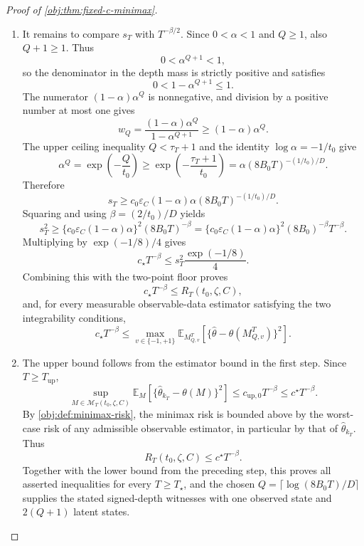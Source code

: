 \documentclass[11pt]{article}
\begin{document}
\begin{proof}[Proof of \cref{obj:thm:fixed-c-minimax}]
\begin{enumerate}
\item It remains to compare \(s_T\) with \(T^{-\beta/2}\). Since \(0<\alpha<1\) and \(Q\ge1\), also \(Q+1\ge1\). Thus
\[
0<\alpha^{Q+1}<1,
\]
so the denominator in the depth mass is strictly positive and satisfies
\[
0<1-\alpha^{Q+1}\le1.
\]
The numerator \((1-\alpha)\alpha^Q\) is nonnegative, and division by a positive number at most one gives
\[
w_Q
=
\frac{(1-\alpha)\alpha^Q}{1-\alpha^{Q+1}}
\ge
(1-\alpha)\alpha^Q .
\]
The upper ceiling inequality \(Q<\tau_T+1\) and the identity \(\log\alpha=-1/t_0\) give
\[
\alpha^Q
=
\exp\!\left(-\frac{Q}{t_0}\right)
\ge
\exp\!\left(-\frac{\tau_T+1}{t_0}\right)
=
\alpha(8B_0T)^{-(1/t_0)/D}.
\]
Therefore
\[
s_T
\ge
c_0\varepsilon_C(1-\alpha)\alpha
(8B_0T)^{-(1/t_0)/D}.
\]
Squaring and using \(\beta=(2/t_0)/D\) yields
\[
s_T^2
\ge
\{c_0\varepsilon_C(1-\alpha)\alpha\}^2
(8B_0T)^{-\beta}
=
\{c_0\varepsilon_C(1-\alpha)\alpha\}^2
(8B_0)^{-\beta}T^{-\beta}.
\]
Multiplying by \(\exp(-1/8)/4\) gives
\[
c_\star T^{-\beta}
\le
s_T^2\frac{\exp(-1/8)}{4}.
\]
Combining this with the two-point floor proves
\[
c_\star T^{-\beta}
\le
R_T(t_0,\zeta,C),
\]
and, for every measurable observable-data estimator satisfying the two integrability conditions,
\[
c_\star T^{-\beta}
\le
\max_{v\in\{-1,+1\}}
\mathbb E_{M_{Q,v}^T}\!\left[
\{\widehat\theta-\theta(M_{Q,v}^T)\}^2
\right].
\] %

\item The upper bound follows from the estimator bound in the first step. Since \(T\ge T_{\mathrm{up}}\),
\[
\sup_{M\in\mathcal M_T(t_0,\zeta,C)}
\mathbb E_M\!\left[
\{\widehat\theta_{k_T}-\theta(M)\}^2
\right]
\le
c_{\mathrm{up},0}T^{-\beta}
\le
c^\star T^{-\beta}.
\]
By \cref{obj:def:minimax-risk}, the minimax risk is bounded above by the worst-case risk of any admissible observable estimator, in particular by that of \(\widehat\theta_{k_T}\). Thus
\[
R_T(t_0,\zeta,C)
\le
c^\star T^{-\beta}.
\]
Together with the lower bound from the preceding step, this proves all asserted inequalities for every \(T\ge T_\star\), and the chosen \(Q=\lceil \log(8B_0T)/D\rceil\) supplies the stated signed-depth witnesses with one observed state and \(2(Q+1)\) latent states. %
\end{enumerate}
\end{proof}
\end{document}
